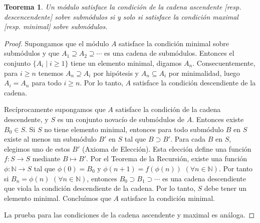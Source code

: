 \documentclass{report}
\newcommand{\naturalNumbers}{\mathbb{N}}
\newtheorem{theorem}{Teorema}
\begin{document}
  \begin{theorem}
    Un módulo satisface la condición de la cadena ascendente [resp. descencendente] sobre submódulos si y solo si satisface la condición maximal [resp. minimal] sobre submódulos.
  \end{theorem}
  \begin{proof}
    Supongamos que el módulo \(A\) satisface la condición minimal sobre submódulos y que \(A_1 \supseteq A_2 \supseteq \cdots\) es una cadena de submódulos.
    Entonces el conjunto \(\{A_i \mid i \geq 1\}\) tiene un elemento minimal, digamos \(A_n\).
    Consecuentemente, para \(i \geq n\) tenemos \(A_n \supseteq A_i\) por hipótesis y \(A_n \subseteq A_i\) por minimalidad, luego \(A_i = A_n\) para todo \(i \geq n\).
    Por lo tanto, \(A\) satisface la condición descendiente de la cadena.

    Recíprocamente supongamos que \(A\) satisface la condición de la cadena descendente, y \(S\) es un conjunto novacío de submódulos de \(A\).
    Entonces existe \(B_0 \in S\).
    Si \(S\) no tiene elemento minimal, entonces para todo submódulo \(B\) en \(S\) existe al menos un submódulo \(B'\) en \(S\) tal que \(B \supset B'\).
    Para cada \(B\) en \(S\), elegimos uno de estos \(B'\) (Axioma de Elección).
    Esta elección define una función \(f : S \rightarrow S\) mediante \(B \mapsto B'\).
    Por el Teorema de la Recursión, existe una función \(\phi : \naturalNumbers \rightarrow S\) tal que \(\phi(0) = B_0\) y \(\phi(n + 1) = f(\phi(n))\) \((\forall n \in \naturalNumbers)\).
    Por tanto si \(B_n = \phi(n)\) \((\forall n \in \naturalNumbers)\), entonces \(B_0 \supset B_1 \supset \cdots\) es una cadena descendiente que viola la condición descendiente de la cadena.
    Por lo tanto, \(S\) debe tener un elemento minimal.
    Concluímos que \(A\) satisface la condición minimal.

    La prueba para las condiciones de la cadena ascendente y maximal es análoga.
  \end{proof}
\end{document}

